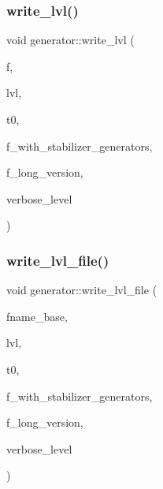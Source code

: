 \subsubsection{\texorpdfstring{write\+\_\+lvl()}{write\_lvl()}}
{\footnotesize\ttfamily void generator\+::write\+\_\+lvl (\begin{DoxyParamCaption}\item[{ostream \&}]{f,  }\item[{\mbox{\hyperlink{galois_8h_a09fddde158a3a20bd2dcadb609de11dc}{I\+NT}}}]{lvl,  }\item[{\mbox{\hyperlink{galois_8h_a09fddde158a3a20bd2dcadb609de11dc}{I\+NT}}}]{t0,  }\item[{\mbox{\hyperlink{galois_8h_a09fddde158a3a20bd2dcadb609de11dc}{I\+NT}}}]{f\+\_\+with\+\_\+stabilizer\+\_\+generators,  }\item[{\mbox{\hyperlink{galois_8h_a09fddde158a3a20bd2dcadb609de11dc}{I\+NT}}}]{f\+\_\+long\+\_\+version,  }\item[{\mbox{\hyperlink{galois_8h_a09fddde158a3a20bd2dcadb609de11dc}{I\+NT}}}]{verbose\+\_\+level }\end{DoxyParamCaption})}

\mbox{\label{classgenerator_a3d343cf5a5831b03d1bda3d89b1dd935}} 
\subsubsection{\texorpdfstring{write\+\_\+lvl\+\_\+file()}{write\_lvl\_file()}}
{\footnotesize\ttfamily void generator\+::write\+\_\+lvl\+\_\+file (\begin{DoxyParamCaption}\item[{\mbox{\hyperlink{galois_8h_ab6cc7b4aeb6ea31aba2b3fbfc83ff5e6}{B\+Y\+TE}} $\ast$}]{fname\+\_\+base,  }\item[{\mbox{\hyperlink{galois_8h_a09fddde158a3a20bd2dcadb609de11dc}{I\+NT}}}]{lvl,  }\item[{\mbox{\hyperlink{galois_8h_a09fddde158a3a20bd2dcadb609de11dc}{I\+NT}}}]{t0,  }\item[{\mbox{\hyperlink{galois_8h_a09fddde158a3a20bd2dcadb609de11dc}{I\+NT}}}]{f\+\_\+with\+\_\+stabilizer\+\_\+generators,  }\item[{\mbox{\hyperlink{galois_8h_a09fddde158a3a20bd2dcadb609de11dc}{I\+NT}}}]{f\+\_\+long\+\_\+version,  }\item[{\mbox{\hyperlink{galois_8h_a09fddde158a3a20bd2dcadb609de11dc}{I\+NT}}}]{verbose\+\_\+level }\end{DoxyParamCaption})}

